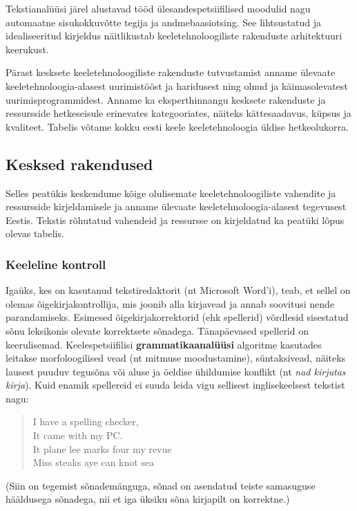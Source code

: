 \begin{multicols}{2}
Tekstianalüüsi järel alustavad tööd ülesandespetsiifilised moodulid nagu automaatne sisukokkuvõtte tegija ja andmebaasiotsing. 
See lihtsustatud ja idealiseeritud kirjeldus näitlikustab keeletehnoloogiliste rakenduste arhitektuuri keerukust. 

Pärast kesksete keeletehnoloogiliste rakenduste tutvustamist anname ülevaate keeletehnoloogia-alasest uurimistööst ja haridusest ning olnud ja käimasolevatest uurimisprogrammidest. 
Anname ka eksperthinnangu kesksete rakenduste ja ressursside hetkeseisule erinevates kategooriates, näiteks kättesaadavus, küpsus ja kvaliteet. 
Tabelis võtame kokku eesti keele keeletehnoloogia üldise hetkeolukorra. 

\subsection{Kesksed rakendused} 

Selles peatükis keskendume kõige olulisemate keeletehnoloogiliste vahendite ja ressursside kirjeldamisele ja anname ülevaate keeletehnoloogia-alasest tegevusest Eestis. 
Tekstis rõhutatud vahendeid ja ressursse on kirjeldatud ka peatüki lõpus olevas tabelis.

\subsubsection{Keeleline kontroll}

Igaüks, kes on kasutanud tekstiredaktorit (nt Microsoft Word’i), teab, et sellel on olemas õigekirjakontrollija, mis joonib alla kirjavead ja annab soovitusi nende parandamiseks. 
Esimesed õigekirjakorrektorid (ehk spellerid) võrdlesid sisestatud sõnu leksikonis olevate korrektsete sõnadega. 
Tänapäevased spellerid on keerulisemad. 
Keelespetsiifilisi \textbf{grammatikaanalüüsi} algoritme kasutades leitakse morfoloogilised vead (nt mitmuse moodustamine), süntaksivead, näiteks lausest puuduv tegusõna või aluse ja öeldise ühildumise konflikt (nt \textit{nad kirjutas kirja}). 
Kuid enamik spellereid ei suuda leida vigu sellisest inglisekeelsest tekstist \cite{zar1} nagu: 
\begin{quote}
      I have a spelling checker,\\
      It came with my PC.\\
      It plane lee marks four my revue\\
      Miss steaks aye can knot sea 
\end{quote}

(Siin on tegemist sõnademänguga, sõnad on asendatud teiste samasuguse hääldusega sõnadega, nii et iga üksiku sõna kirjapilt on korrektne.)


\end{multicols}
